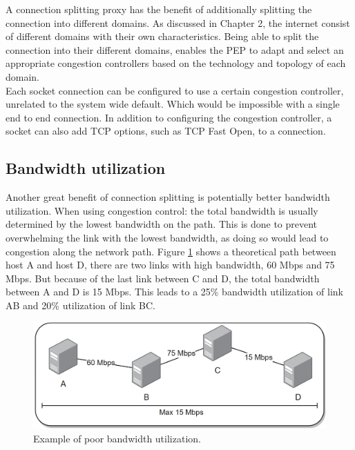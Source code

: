 \documentclass[a4paper,english, 11pt]{report}
\begin{document}
A connection splitting proxy has the benefit of additionally splitting the connection into different domains. As discussed in Chapter 2, the internet consist of different domains with their own characteristics. Being able to split the connection into their different domains, enables the PEP to adapt and select an appropriate congestion controllers based on the technology and topology of each domain.\\

Each socket connection can be configured to use a certain congestion controller, unrelated to the system wide default. Which would be impossible with a single end to end connection. In addition to configuring the congestion controller, a socket can also add TCP options, such as TCP Fast Open, to a connection.

\subsection{Bandwidth utilization}
Another great benefit of connection splitting is potentially better bandwidth utilization. When using congestion control: the total bandwidth is usually determined by the lowest bandwidth on the path\cite{top_down}. This is done to prevent overwhelming the link with the lowest bandwidth, as doing so would lead to congestion along the network path. Figure \ref{fig:pep_bandwidth_bad} shows a theoretical path between host A and host D, there are two links with high bandwidth, 60 Mbps and 75 Mbps. But because of the last link between C and D, the total bandwidth between A and D is 15 Mbps. This leads to a 25\% bandwidth utilization of link AB and 20\% utilization of link BC.\\

\begin{figure}[h!] %
	\centering
	\includegraphics[scale=0.45]{../diagrams/drawio/bandwidth_bad.png}
  	\caption{Example of poor bandwidth utilization.}
  	\label{fig:pep_bandwidth_bad}
\end{figure}
\end{document}
